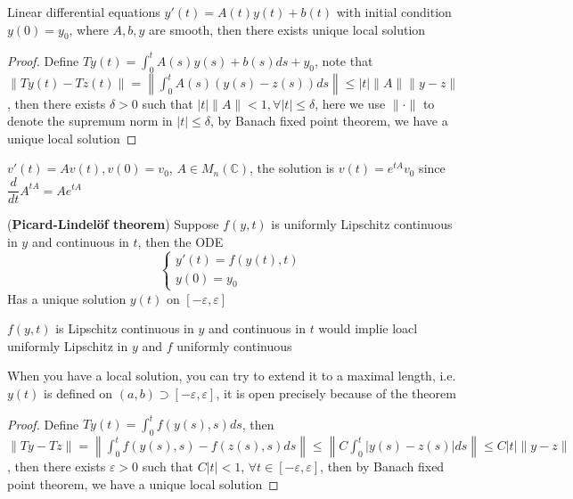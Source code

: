 \documentclass[main]{subfiles}
\begin{document}
\begin{theorem}
Linear differential equations $y'(t)=A(t)y(t)+b(t)$ with initial condition $y(0)=y_0$, where $A, b, y$ are smooth, then there exists unique local solution
\end{theorem}

\begin{proof}
Define $Ty(t)=\displaystyle\int_0^tA(s)y(s)+b(s)ds+y_0$, note that $\|Ty(t)-Tz(t)\|=\displaystyle\left\|\int_0^tA(s)(y(s)-z(s))ds\right\|\leq|t|\|A\|\|y-z\|$, then there exists $\delta>0$ such that $|t|\|A\|<1,\forall |t|\leq\delta$, here we use $\|\cdot\|$ to denote the supremum norm in $|t|\leq\delta$, by Banach fixed point theorem, we have a unique local solution
\end{proof}

\begin{example}
$v'(t)=Av(t),v(0)=v_0$, $A\in M_n(\mathbb C)$, the solution is $v(t)=e^{tA}v_0$ since $\dfrac{d}{dt}A^{tA}=Ae^{tA}$
\end{example}

\begin{theorem}(\textbf{Picard-Lindel\"of theorem})\label{Picard-Lindelof theorem}
Suppose $f(y,t)$ is uniformly Lipschitz continuous in $y$ and continuous in $t$, then the ODE $$\begin{cases}
y'(t)=f(y(t),t) \\
y(0)=y_0
\end{cases}$$Has a unique solution $y(t)$ on $[-\varepsilon,\varepsilon]$
\end{theorem}

\begin{remark}
$f(y,t)$ is Lipschitz continuous in $y$ and continuous in $t$ would implie loacl uniformly Lipschitz in $y$ and $f$ uniformly continuous \par
When you have a local solution, you can try to extend it to a maximal length, i.e. $y(t)$ is defined on $(a,b)\supset[-\varepsilon,\varepsilon]$, it is open precisely because of the theorem
\end{remark}

\begin{proof}
Define $Ty(t)=\displaystyle\int_0^tf(y(s),s)ds$, then \\
$\displaystyle\|Ty-Tz\|=\left\|\int_0^tf(y(s),s)-f(z(s),s)ds\right\|\leq\left\|C\int_0^t|y(s)-z(s)|ds\right\|\leq C|t|\|y-z\|$, then there exists $\varepsilon>0$ such that $C|t|<1$, $\forall t\in[-\varepsilon,\varepsilon]$, then by Banach fixed point theorem, we have a unique local solution
\end{proof}
\end{document}
